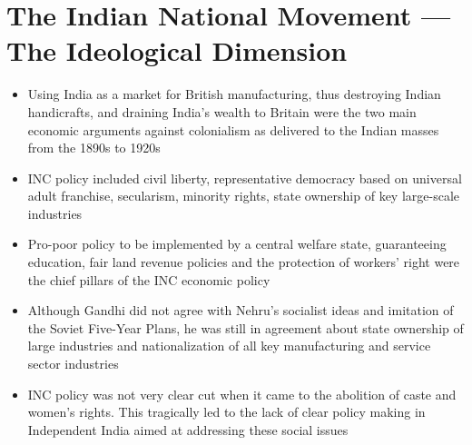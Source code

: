 \section{The Indian National Movement — The Ideological Dimension}
\begin{itemize}
    \item Using India as a market for British manufacturing, thus destroying Indian handicrafts, and draining India's wealth to Britain were the two main economic arguments against colonialism as delivered to the Indian masses from the 1890s to 1920s
    \item INC policy included civil liberty, representative democracy based on universal adult franchise, secularism, minority rights, state ownership of key large-scale industries
    \item Pro-poor policy to be implemented by a central welfare state, guaranteeing education, fair land revenue policies and the protection of workers' right were the chief pillars of the INC economic policy
    \item Although Gandhi did not agree with Nehru's socialist ideas and imitation of the Soviet Five-Year Plans, he was still in agreement about state ownership of large industries and nationalization of all key manufacturing and service sector industries
    \item INC policy was not very clear cut when it came to the abolition of caste and women's rights. This tragically led to the lack of clear policy making in Independent India aimed at addressing these social issues
\end{itemize}